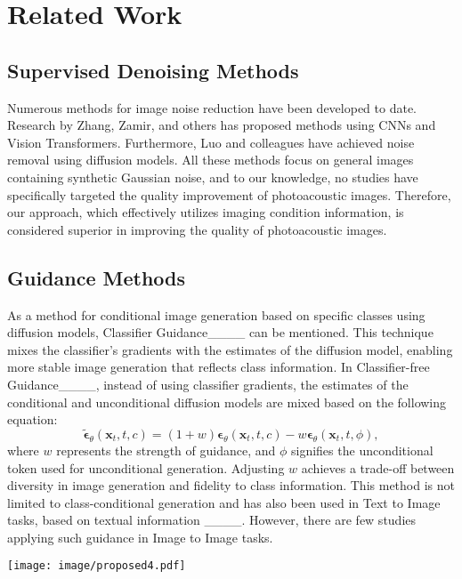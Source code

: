 \section{Related Work}
\label{sec:relatedwork}
\subsection{Supervised Denoising Methods}
Numerous methods for image noise reduction have been developed to date. Research by Zhang, Zamir, and others has proposed methods using CNNs and Vision Transformers. Furthermore, Luo and colleagues have achieved noise removal using diffusion models. All these methods focus on general images containing synthetic Gaussian noise, and to our knowledge, no studies have specifically targeted the quality improvement of photoacoustic images. Therefore, our approach, which effectively utilizes imaging condition information, is considered superior in improving the quality of photoacoustic images.

\subsection{Guidance Methods}

As a method for conditional image generation based on specific classes using diffusion models, Classifier Guidance____ can be mentioned. This technique mixes the classifier's gradients with the estimates of the diffusion model, enabling more stable image generation that reflects class information. In Classifier-free Guidance____, instead of using classifier gradients, the estimates of the conditional and unconditional diffusion models are mixed based on the following equation:
\begin{equation}
    \tilde{\bm{\epsilon}}_\theta(\bm{x}_t,t,c) = (1+w)\bm{\epsilon}_\theta(\bm{x}_t,t,c) - w\bm{\epsilon}_\theta(\bm{x}_t,t,\phi),
    \label{eq:cfg}
\end{equation}
where $w$ represents the strength of guidance, and $\phi$ signifies the unconditional token used for unconditional generation. Adjusting $w$ achieves a trade-off between diversity in image generation and fidelity to class information. This method is not limited to class-conditional generation and has also been used in Text to Image tasks, based on textual information ____. However, there are few studies applying such guidance in Image to Image tasks.

\begin{figure*}[t]
    \centering
    \texttt{[image: image/proposed4.pdf]}
    \caption{}
    \label{fig:proposed}
\end{figure*}